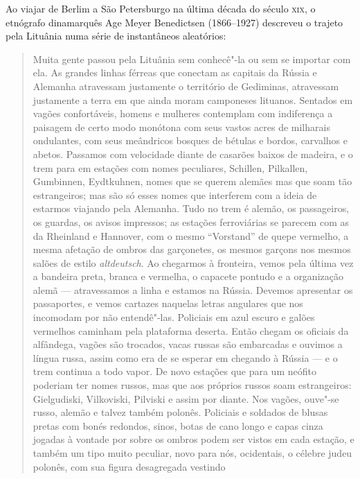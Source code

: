 \asterisc

Ao viajar de Berlim a São Petersburgo na última década do século \textsc{xix}, o
etnógrafo dinamarquês Age Meyer Benedictsen (1866--1927) descreveu o
trajeto pela Lituânia numa série de instantâneos aleatórios:

%

\begin{quote}
Muita gente passou pela Lituânia sem conhecê"-la ou sem se importar com
ela. As grandes linhas férreas que conectam as capitais da Rússia e
Alemanha atravessam justamente o território de Gediminas, atravessam
justamente a terra em que ainda moram camponeses lituanos. Sentados em
vagões confortáveis, homens e mulheres contemplam com indiferença a
paisagem de certo modo monótona com seus vastos acres de milharais
ondulantes, com seus meândricos bosques de bétulas e bordos, carvalhos e
abetos. Passamos com velocidade diante de casarões baixos de madeira, e
o trem para em estações com nomes peculiares, Schillen, Pilkallen,
Gumbinnen, Eydtkuhnen, nomes que se querem alemães mas que soam tão
estrangeiros; mas são só esses nomes que interferem com a ideia de
estarmos viajando pela Alemanha. Tudo no trem é alemão, os passageiros,
os guardas, os avisos impressos; as estações ferroviárias se parecem com
as da Rheinland e Hannover, com o mesmo ``Vorstand'' de quepe vermelho,
a mesma afetação de ombros das garçonetes, os mesmos garçons nos mesmos
salões de estilo \textit{altdeutsch}. Ao chegarmos à fronteira, vemos pela
última vez a bandeira preta, branca e vermelha, o capacete pontudo e a
organização alemã --- atravessamos a linha e estamos na Rússia. Devemos
apresentar os passaportes, e vemos cartazes naquelas letras angulares
que nos incomodam por não entendê"-las. Policiais em azul escuro e galões
vermelhos caminham pela plataforma deserta. Então chegam os oficiais da
alfândega, vagões são trocados, vacas russas são embarcadas e ouvimos a
língua russa, assim como era de se esperar em chegando à Rússia --- e o
trem continua a todo vapor. De novo estações que para um neófito
poderiam ter nomes russos, mas que aos próprios russos soam
estrangeiros: Gielgudiski, Vilkoviski, Pilviski e assim por diante. Nos
vagões, ouve"-se russo, alemão e talvez também polonês. Policiais e
soldados de blusas pretas com bonés redondos, sinos, botas de cano longo
e capas cinza jogadas à vontade por sobre os ombros podem ser vistos em
cada estação, e também um tipo muito peculiar, novo para nós,
ocidentais, o célebre judeu polonês, com sua figura desagregada vestindo

\end{quote}
